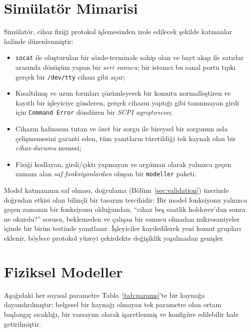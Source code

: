 \documentclass[conference]{IEEEtran}
\begin{document}
\section{Simülatör Mimarisi}
\label{sec:arch}
Simülatör, cihaz fiziği protokol işlemesinden izole edilecek şekilde katmanlar halinde düzenlenmiştir:
\begin{itemize}
\item \texttt{socat} ile oluşturulan bir sözde-terminale sahip olan ve bayt akışı ile satırlar arasında dönüşüm yapan bir \emph{seri sunucu}; bir istemci bu sanal portu tıpkı gerçek bir \texttt{/dev/tty} cihazı gibi açar;
\item Kısaltılmış ve uzun formları çözümleyerek bir komutu normalleştiren ve kayıtlı bir işleyiciye gönderen, gerçek cihazın yaptığı gibi tanınmayan girdi için \texttt{Command Error} döndüren bir \emph{SCPI ayrıştırıcısı};
\item Cihazın hafızasını tutan ve özet bir sorgu ile bireysel bir sorgunun asla çelişmemesini garanti eden, tüm yanıtların türetildiği tek kaynak olan bir \emph{cihaz-durumu} nesnesi;
\item Fiziği kodlayan, girdi/çıktı yapmayan ve argüman olarak yalnızca geçen zamanı alan \emph{saf fonksiyonlardan} oluşan bir \texttt{modeller} paketi.
\end{itemize}
Model katmanının saf olması, doğrulama (Bölüm~\ref{sec:validation}) üzerinde doğrudan etkisi olan bilinçli bir tasarım tercihidir: Bir model fonksiyonu yalnızca geçen zamanın bir fonksiyonu olduğundan, ``cihaz beş saatlik holdover'dan sonra ne okurdu?'' sorusu, beklemeden ve çalışan bir sunucu olmadan mikrosaniyeler içinde bir birim testinde yanıtlanır. İşleyiciler kaydedilerek yeni komut grupları eklenir, böylece protokol yüzeyi çekirdekte değişiklik yapılmadan genişler.

\section{Fiziksel Modeller}
\label{sec:models}
Aşağıdaki her sayısal parametre Tablo~\ref{tab:params}'te bir kaynağa dayandırılmıştır; belgesel bir kaynağı olmayan tek parametre olan ortam başlangıç sıcaklığı, bir varsayım olarak işaretlenmiş ve konfigüre edilebilir hale getirilmiştir.
\end{document}
